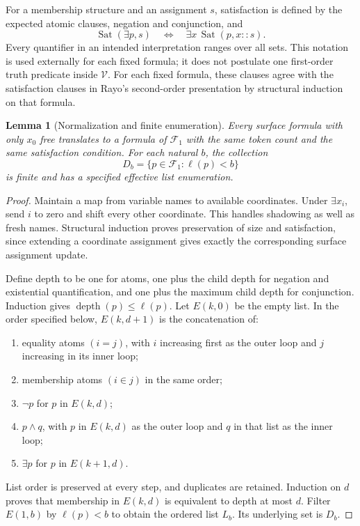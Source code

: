 \documentclass[11pt]{article}
\newtheorem{lemma}[theorem]{Lemma}
\newcommand{\V}{\mathcal V}
\newcommand{\F}{\mathcal F}
\newcommand{\Sat}{\operatorname{Sat}}
\begin{document}
For a membership structure and an assignment $s$, satisfaction is defined by
the expected atomic clauses, negation and conjunction, and
\[
 \Sat(\exists p,s)\quad\Longleftrightarrow\quad
 \exists x\,\Sat(p,x::s).
\]
Every quantifier in an intended interpretation ranges over all sets. This
notation is used externally for each fixed formula; it does not postulate
one first-order truth predicate inside $\V$.
For each fixed formula, these clauses agree with the satisfaction clauses in
Rayo's second-order presentation by structural induction on that formula.

\begin{lemma}[Normalization and finite enumeration]\label{lem:syntax}
Every surface formula with only $x_0$ free translates to a formula of $\F_1$
with the same token count and the same satisfaction condition. For each
natural $b$, the collection
\[
                 D_b=\{p\in\F_1:\ell(p)<b\}
\]
is finite and has a specified effective list enumeration.
\end{lemma}
\begin{proof}
Maintain a map from variable names to available coordinates. Under
$\exists x_i$, send $i$ to zero and shift every other coordinate. This handles
shadowing as well as fresh names. Structural induction proves preservation
of size and satisfaction, since extending a coordinate assignment gives
exactly the corresponding surface assignment update.

Define depth to be one for atoms, one plus the child depth for negation and
existential quantification, and one plus the maximum child depth for
conjunction. Induction gives $\operatorname{depth}(p)\leq\ell(p)$.
Let $E(k,0)$ be the empty list. In the order specified below, $E(k,d+1)$ is
the concatenation of:
\begin{enumerate}
\item equality atoms $(i=j)$, with $i$ increasing first as the outer loop and
      $j$ increasing in its inner loop;
\item membership atoms $(i\in j)$ in the same order;
\item $\neg p$ for $p$ in $E(k,d)$;
\item $p\wedge q$, with $p$ in $E(k,d)$ as the outer loop and $q$ in that
      list as the inner loop;
\item $\exists p$ for $p$ in $E(k+1,d)$.
\end{enumerate}
List order is preserved at every step, and duplicates are retained.
Induction on $d$ proves that membership in $E(k,d)$ is equivalent to depth
at most $d$. Filter $E(1,b)$ by $\ell(p)<b$ to obtain the ordered list
$L_b$. Its underlying set is $D_b$.
\end{proof}
\end{document}
